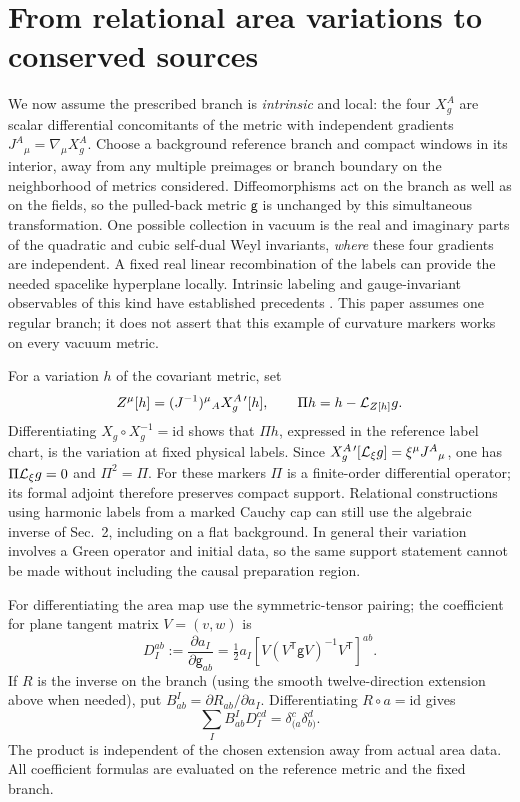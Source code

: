 \documentclass[11pt]{article}
\newcommand{\gmark}{\mathsf g}
\begin{document}
\section{From relational area variations to conserved sources}
We now assume the prescribed branch is \emph{intrinsic} and local: the four \(X_g^A\) are scalar differential concomitants of the metric with independent gradients \(J^A{}_\mu=\nabla_\mu X_g^A\). Choose a background reference branch and compact windows in its interior, away from any multiple preimages or branch boundary on the neighborhood of metrics considered. Diffeomorphisms act on the branch as well as on the fields, so the pulled-back metric \(\gmark\) is unchanged by this simultaneous transformation. One possible collection in vacuum is the real and imaginary parts of the quadratic and cubic self-dual Weyl invariants, \emph{where} these four gradients are independent. A fixed real linear recombination of the labels can provide the needed spacelike hyperplane locally. Intrinsic labeling and gauge-invariant observables of this kind have established precedents \cite{Khavkine,BFR,BFHKP}. This paper assumes one regular branch; it does not assert that this example of curvature markers works on every vacuum metric.

For a variation \(h\) of the covariant metric, set
\[
  Z^\mu[h]=(J^{-1})^\mu{}_A X_g^{A\,\prime}[h],\qquad
  \Pi h=h-\mathcal L_{Z[h]}g .
\]
Differentiating \(X_g\circ X_g^{-1}=\mathrm{id}\) shows that \(\Pi h\), expressed in the reference label chart, is the variation at fixed physical labels. Since \(X_g^{A\,\prime}[\mathcal L_\xi g]=\xi^\mu J^A{}_\mu\), one has \(\Pi\mathcal L_\xi g=0\) and \(\Pi^2=\Pi\). For these markers \(\Pi\) is a finite-order differential operator; its formal adjoint therefore preserves compact support. Relational constructions using harmonic labels from a marked Cauchy cap \cite{FrobLima} can still use the algebraic inverse of Sec.~2, including on a flat background. In general their variation involves a Green operator and initial data, so the same support statement cannot be made without including the causal preparation region.

For differentiating the area map use the symmetric-tensor pairing; the coefficient for plane tangent matrix \(V=(v,w)\) is
\[
 D_I^{ab}:=\frac{\partial a_I}{\partial\gmark_{ab}}
   =\tfrac12 a_I [V(V^{\mathsf T}\gmark V)^{-1}V^{\mathsf T}]^{ab}.
\]
If \(R\) is the inverse on the branch (using the smooth twelve-direction extension above when needed), put \(B^I_{ab}=\partial R_{ab}/\partial a_I\). Differentiating \(R\circ a=\mathrm{id}\) gives
\begin{equation}
 \sum_I B^I_{ab}D_I^{cd}=\delta^c_{(a}\delta^d_{b)} .
 \label{right}
\end{equation}
The product is independent of the chosen extension away from actual area data. All coefficient formulas are evaluated on the reference metric and the fixed branch.
\end{document}
